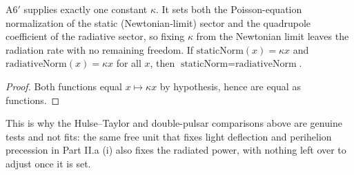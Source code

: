 \begin{theorem}
A6$'$ supplies exactly one constant $\kappa$. It sets both the Poisson-equation
normalization of the static (Newtonian-limit) sector and the quadrupole
coefficient of the radiative sector, so fixing $\kappa$ from the Newtonian
limit leaves the radiation rate with no remaining freedom. If
$\text{staticNorm}(x) = \kappa x$ and $\text{radiativeNorm}(x) = \kappa x$ for
all $x$, then $\text{staticNorm} = \text{radiativeNorm}$.
\end{theorem}
\begin{proof}
Both functions equal $x \mapsto \kappa x$ by hypothesis, hence are equal as
functions.
\end{proof}

This is why the Hulse--Taylor and double-pulsar comparisons above are genuine
tests and not fits: the same free unit that fixes light deflection and
perihelion precession in Part II.a (i) also fixes the radiated power, with
nothing left over to adjust once it is set.

